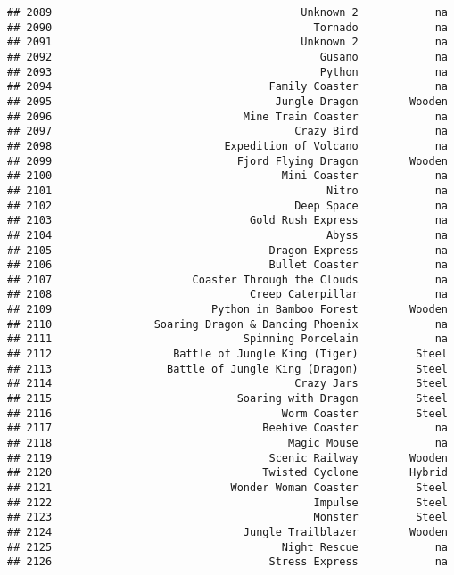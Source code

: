 \documentclass[
]{article}
\begin{document}
\begin{verbatim}
## 2089                                       Unknown 2            na
## 2090                                         Tornado            na
## 2091                                       Unknown 2            na
## 2092                                          Gusano            na
## 2093                                          Python            na
## 2094                                  Family Coaster            na
## 2095                                   Jungle Dragon        Wooden
## 2096                              Mine Train Coaster            na
## 2097                                      Crazy Bird            na
## 2098                           Expedition of Volcano            na
## 2099                             Fjord Flying Dragon        Wooden
## 2100                                    Mini Coaster            na
## 2101                                           Nitro            na
## 2102                                      Deep Space            na
## 2103                               Gold Rush Express            na
## 2104                                           Abyss            na
## 2105                                  Dragon Express            na
## 2106                                  Bullet Coaster            na
## 2107                      Coaster Through the Clouds            na
## 2108                               Creep Caterpillar            na
## 2109                         Python in Bamboo Forest        Wooden
## 2110                Soaring Dragon & Dancing Phoenix            na
## 2111                              Spinning Porcelain            na
## 2112                   Battle of Jungle King (Tiger)         Steel
## 2113                  Battle of Jungle King (Dragon)         Steel
## 2114                                      Crazy Jars         Steel
## 2115                             Soaring with Dragon         Steel
## 2116                                    Worm Coaster         Steel
## 2117                                 Beehive Coaster            na
## 2118                                     Magic Mouse            na
## 2119                                  Scenic Railway        Wooden
## 2120                                 Twisted Cyclone        Hybrid
## 2121                            Wonder Woman Coaster         Steel
## 2122                                         Impulse         Steel
## 2123                                         Monster         Steel
## 2124                              Jungle Trailblazer        Wooden
## 2125                                    Night Rescue            na
## 2126                                  Stress Express            na

\end{verbatim}
\end{document}
